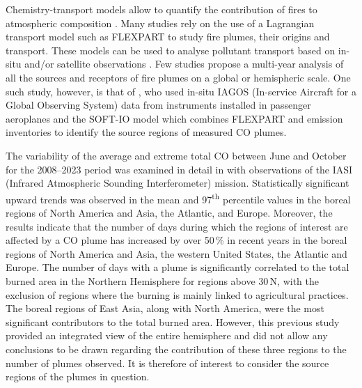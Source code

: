 \documentclass[acp, manuscript]{copernicus}
\begin{document}
Chemistry-transport models allow to quantify the contribution of fires to atmospheric composition \citep[e.g][]{arnoldBiomassBurningInfluence2015a,yeEvaluationIntercomparisonWildfire2021b}. Many studies rely on the use of a Lagrangian transport model such as FLEXPART \citep{stohlValidationLagrangianParticle1998a,stohlTechnicalNoteLagrangian2005,pissoLagrangianParticleDispersion2019} to study fire plumes, their origins and transport. These models can be used to analyse pollutant transport based on in-situ \citep[e.g][]{owenAnalysisMechanismsNorth2006} and/or satellite observations \citep[e.g][]{duflotMarineBiomassBurning2011,bencherifInvestigatingLongRangeTransport2020c,kimInverseModelingFire2020,smoydzinContributionAsianEmissions2022}. Few  studies propose a multi-year analysis of all the sources and receptors of fire plumes on a global or hemispheric scale. One such study, however, is that of \citet{lebourgeoisSeasonalRegionalVertical2024a}, who used in-situ IAGOS (In-service Aircraft for a Global Observing System) data from instruments installed in passenger aeroplanes and the SOFT-IO model \citep{sauvageSourceAttributionUsing2017} which combines FLEXPART and emission inventories to identify the source regions of measured CO plumes. 


The variability of the average and extreme total CO between June and October for the 2008--2023 period was examined in detail in \citet{ehretIncreaseCarbonMonoxide2025} with observations of the IASI (Infrared Atmospheric Sounding Interferometer) mission. Statistically significant upward trends was observed in the mean and 97\textsuperscript{th} percentile values in the boreal regions of North America and Asia, the Atlantic, and Europe. Moreover, the results indicate that the number of days during which the regions of interest are affected by a CO plume has increased by over 50\,\% in recent years in the boreal regions of North America and Asia, the western United States, the Atlantic and Europe. The number of days with a plume is significantly correlated to the total burned area in the Northern Hemisphere for regions above 30\,\textdegree N, with the exclusion of regions where the burning is mainly linked to agricultural practices. The boreal regions of East Asia, along with North America, were the most significant contributors to the total burned area. However, this previous study provided an integrated view of the entire hemisphere and did not allow any conclusions to be drawn regarding the contribution of these three regions to the number of plumes observed. It is therefore of interest to consider the source regions of the plumes in question. 
\end{document}
